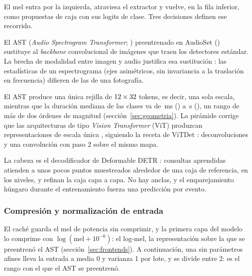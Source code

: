 El mel entra por la izquierda, atraviesa el extractor y vuelve, en la fila
inferior, como \mQueries{} propuestas de caja con sus logits de clase. Tres
decisiones definen ese recorrido.

 El AST
(\emph{Audio Spectrogram Transformer}; \citealp{gong_ast_2021}) preentrenado en
AudioSet \citep{gemmeke_audioset_2017} (\mAstCheckpoint{}) sustituye al \textit{backbone} convolucional de imágenes que
traen los detectores estándar. La brecha de modalidad entre imagen y audio
justifica esa sustitución \citep{zhu_sound_2025}: las estadísticas de un
espectrograma (ejes asimétricos, sin invariancia a la traslación en
frecuencia) difieren de las de una fotografía.

 El AST produce una única
rejilla de $12 \times 32$ tokens, es decir, una sola escala,
mientras que la duración mediana de las clases va de \mShortestClassMs{}\,ms
(\mShortestClass{}) a \mLongestClassS{}\,s (\mLongestClass{}), un rango de más de
dos órdenes de magnitud (sección~\ref{sec:geometria}). La pirámide corrige que
las arquitecturas de tipo \textit{Vision Transformer} (ViT) produzcan representaciones de escala única
\citep{zhu_sound_2025}, siguiendo la receta de ViTDet \citep{li_vitdet_2022}: deconvoluciones y una
convolución con paso 2 sobre el mismo mapa.

 La cabeza es el
decodificador de Deformable DETR \citep{zhu_deformable_2021}: \mQueries{}
consultas aprendidas atienden a unos pocos puntos muestreados alrededor de una
caja de referencia, en los \mLevels{} niveles, y refinan la caja capa a capa. No
hay anclas, y el emparejamiento húngaro \citep{kuhn_hungarian_1955} durante el entrenamiento fuerza una
predicción por evento.

\subsubsection{Compresión y normalización de entrada}

El caché guarda el mel de potencia sin comprimir, y la primera capa del modelo lo
comprime con $\log(\mathrm{mel} + 10^{-6})$: el log-mel, la representación sobre
la que se preentrenó el AST (sección~\ref{sec:frontends}).
A continuación, una  sin parámetros afines lleva la entrada a
media 0 y varianza 1 por lote, y se divide entre 2: es el rango con el que el AST
se preentrenó.

